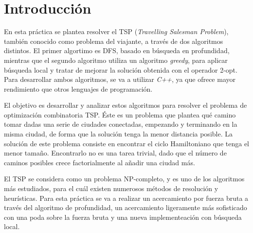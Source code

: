\documentclass{uc3mpracticas}
\begin{document}
  \frontmatter



  \vspace{55mm}


  \newpage

  \tableofcontents

\newpage

  \mainmatter
  
  \section{Introducción}

  En esta práctica se plantea resolver el TSP (\textit{Travelling Salesman Problem}), también conocido como problema del viajante, a través de dos algoritmos distintos. El primer algortimo es DFS, basado en búsqueda en profundidad, mientras que el segundo algoritmo utiliza un algoritmo \textit{greedy}, para aplicar búsqueda local y tratar de mejorar la solución obtenida con el operador 2-opt. Para desarrollar ambos algoritmos, se va a utilizar \textit{C++}, ya que ofrece mayor rendimiento que otros lenguajes de programación.

  \vspace{2mm}

  El objetivo es desarrollar y analizar estos algoritmos para resolver el problema de optimización combinatoria TSP. Éste es un problema que plantea qué camino tomar dadas una serie de ciudades conectadas, empezando y terminando en la misma ciudad, de forma que la solución tenga la menor distancia posible. La solución de este problema consiste en encontrar el ciclo Hamiltoniano que tenga el menor tamaño. Encontrarlo no es una tarea trivial, dado que el número de caminos posibles crece factorialmente al añadir una ciudad más.

  \vspace{2mm}

  El TSP se considera como un problema NP-completo, y es uno de los algoritmos más estudiados, para el cuál existen numerosos métodos de resolución y heurísticas. Para esta práctica se va a realizar un acercamiento por fuerza bruta a través del algoritmo de profundidad, un acercamiento ligeramente más sofisticado con una poda sobre la fuerza bruta y una nueva implementeación con búsqueda local.
\end{document}
